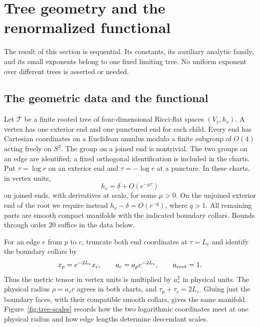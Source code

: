 \section{Tree geometry and the renormalized functional}
\label{sec:elliptic}

The result of this section is sequential.  Its constants, its auxiliary
analytic family, and its small exponents belong to one fixed limiting tree.
No uniform exponent over different trees is asserted or needed.

\subsection{The geometric data and the functional}
\label{ell:setup}

Let $\mathcal T$ be a finite rooted tree of four-dimensional Ricci-flat
spaces $(V_v,h_v)$.  A vertex has one exterior end and one punctured end
for each child.  Every end has Cartesian coordinates on a Euclidean
annulus modulo a finite subgroup of $O(4)$ acting freely on $S^3$.
The group on a joined end is nontrivial.  The two groups on an edge
are identified; a fixed orthogonal identification is included in the
charts.  Put $\tau=\log r$ on an exterior end and $\tau=-\log r$ at a
puncture.  In these charts, in vertex units,
\begin{equation}
 h_v=\delta+O(e^{-\mu\tau})
 \label{ell:end-decay}
\end{equation}
on joined ends, with derivatives at scale, for some $\mu>0$.
On the unjoined exterior end of the root we require instead
$h_v-\delta=O(r^{-q})$, where $q>1$.
All remaining parts are smooth compact manifolds with the indicated
boundary collars.  Bounds through order $20$ suffice in the data below.

For an edge $e$ from $p$ to $c$, truncate both end coordinates at
$\tau=L_e$ and identify the boundary collars by
\begin{equation}
 x_p=e^{-2L_e}x_c,\qquad a_c=a_p e^{-2L_e},\qquad a_{\rm root}=1.
 \label{ell:scales}
\end{equation}
Thus the metric tensor in vertex units is multiplied by $a_v^2$ in
physical units.  The physical radius $\rho=a_vr$ agrees in both charts,
and $\tau_p+\tau_c=2L_e$.  Gluing just the boundary faces, with their
compatible smooth collars, gives the same manifold.
Figure~\ref{fig:tree-scales} records how the two logarithmic coordinates
meet at one physical radius and how edge lengths determine descendant
scales.

